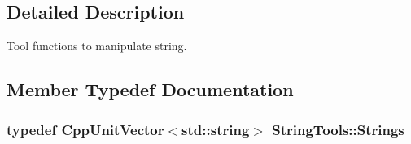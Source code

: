 \subsection{Detailed Description}
Tool functions to manipulate string. 

\subsection{Member Typedef Documentation}
\hypertarget{struct_string_tools_ab01d065d80c39015955e9f765cd19921}{
\subsubsection[{Strings}]{\setlength{\rightskip}{0pt plus 5cm}typedef {\bf Cpp\-Unit\-Vector}$<${\bf std\-::string}$>$ {\bf String\-Tools\-::\-Strings}}}\label{struct_string_tools_ab01d065d80c39015955e9f765cd19921}


